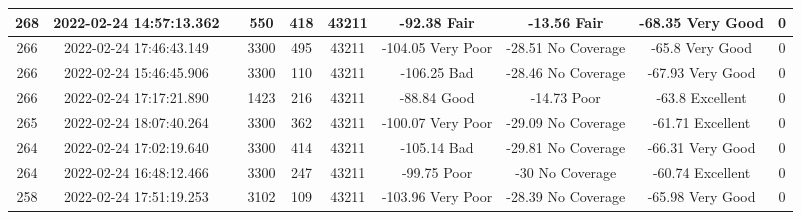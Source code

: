 \begin{longtable*}{|c|c|c|c|c|c|c|c|c|c|}
268&2022-02-24 14:57:13.362&&550&418&43211& -92.38    Fair        & -13.56    Fair        & -68.35    Very Good   & 0\\\hline
{}266&2022-02-24 17:46:43.149&&3300&495&43211& -104.05   Very Poor   & -28.51    No Coverage & -65.8     Very Good   & 0\\\hline
{}266&2022-02-24 15:46:45.906&&3300&110&43211& -106.25   Bad         & -28.46    No Coverage & -67.93    Very Good   & 0\\\hline
{}266&2022-02-24 17:17:21.890&&1423&216&43211& -88.84    Good        & -14.73    Poor        & -63.8     Excellent   & 0\\\hline
{}265&2022-02-24 18:07:40.264&&3300&362&43211& -100.07   Very Poor   & -29.09    No Coverage & -61.71    Excellent   & 0\\\hline
{}264&2022-02-24 17:02:19.640&&3300&414&43211& -105.14   Bad         & -29.81    No Coverage & -66.31    Very Good   & 0\\\hline
{}264&2022-02-24 16:48:12.466&&3300&247&43211& -99.75    Poor        & -30       No Coverage & -60.74    Excellent   & 0\\\hline
{}258&2022-02-24 17:51:19.253&&3102&109&43211& -103.96   Very Poor   & -28.39    No Coverage & -65.98    Very Good   & 0\\\hline

\end{longtable*}
